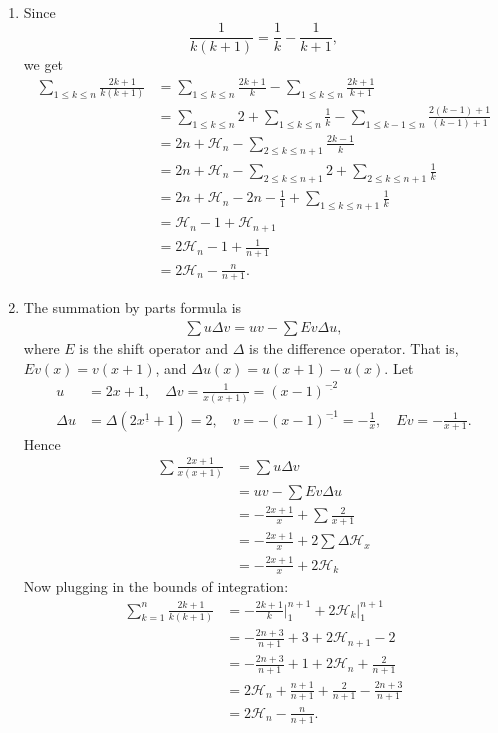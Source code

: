 \documentclass[12pt]{article}
\newenvironment{sol}[1][Solution]{\begin{trivlist}
		\item[\hskip \labelsep {\bfseries #1:}]}{\end{trivlist}}
\begin{document}
\begin{sol}
	\
	\begin{enumerate}[label=(\alph*)]
		\item Since
		\[
		\frac{1}{k(k+1)}=\frac{1}{k}-\frac{1}{k+1},
		\]
		we get
		\begin{align*}
			\sum_{1\leq k\leq n}\frac{2k+1}{k(k+1)}
			&=\sum_{1\leq k\leq n}\frac{2k+1}{k}-\sum_{1\leq k\leq n}\frac{2k+1}{k+1}\\
			&=\sum_{1\leq k\leq n}2+\sum_{1\leq k\leq n}\frac{1}{k}
			-\sum_{1\leq k-1\leq n}\frac{2(k-1)+1}{(k-1)+1}\\
			&=2n+\mathcal{H}_{n}-\sum_{2\leq k\leq n+1}\frac{2k-1}{k}\\
			&=2n+\mathcal{H}_{n}-\sum_{2\leq k\leq n+1}2+\sum_{2\leq k\leq n+1}\frac{1}{k}\\
			&=2n+\mathcal{H}_{n}-2n-\frac{1}{1}+\sum_{1\leq k\leq n+1}\frac{1}{k}\\
			&=\mathcal{H}_n-1+\mathcal{H}_{n+1}\\
			&=2\mathcal{H}_n-1+\frac{1}{n+1}\\
			&=2\mathcal{H}_n-\frac{n}{n+1}.
		\end{align*}
		\item The summation by parts formula is
		\begin{align*}
			\sum u\Delta v=uv-\sum Ev\Delta u,
		\end{align*}
		where $E$ is the shift operator and $\Delta$ is the difference operator. That is,
		$Ev(x)=v(x+1)$, and $\Delta u(x)=u(x+1)-u(x)$. Let
		\begin{align*}
			u&=2x+1,\quad \Delta v=\frac{1}{x(x+1)}=(x-1)^{\underline{-2}}\\
			\Delta u&=\Delta(2x^{\underline{1}}+1)=2,\quad v=-(x-1)^{\underline{-1}}=-\frac{1}{x},\quad
			Ev=-\frac{1}{x+1}.
		\end{align*}
		Hence
		\begin{align*}
			\sum \frac{2x+1}{x(x+1)}&=\sum u\Delta v\\
			&=uv-\sum Ev\Delta u\\
			&=-\frac{2x+1}{x}+\sum \frac{2}{x+1}\\
			&=-\frac{2x+1}{x}+2\sum \Delta \mathcal{H}_x\\
			&=-\frac{2x+1}{x}+2\mathcal{H}_k
		\end{align*}
		Now plugging in the bounds of integration:
		\begin{align*}
			\sum_{k=1}^{n}\frac{2k+1}{k(k+1)}
			&=-\frac{2k+1}{k}\bigg\rvert_{1}^{n+1}+2\mathcal{H}_k\bigg\rvert_{1}^{n+1}\\
			&=-\frac{2n+3}{n+1}+3+2\mathcal{H}_{n+1}-2\\
			&=-\frac{2n+3}{n+1}+1+2\mathcal{H}_n+\frac{2}{n+1}\\
			&=2\mathcal{H}_n+\frac{n+1}{n+1}+\frac{2}{n+1}-\frac{2n+3}{n+1}\\
			&=2\mathcal{H}_n-\frac{n}{n+1}.
		\end{align*}
	\end{enumerate}
\end{sol}
\end{document}

